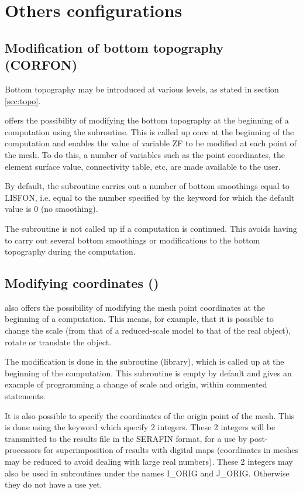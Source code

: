 \chapter{Others configurations}

\section{Modification of bottom topography (CORFON)}

Bottom topography may be introduced at various levels, as stated in section
\ref{sec:topo}.

 offers the possibility of modifying the bottom topography at the
beginning of a computation using the  subroutine. This is
called up once at the beginning of the computation and enables the value of
variable ZF to be modified at each point of the mesh. To do this, a number of
variables such as the point coordinates, the element surface value,
connectivity table, etc, are made available to the user.

By default, the  subroutine carries out a number of bottom
smoothings equal to LISFON, i.e. equal to the number specified by the keyword
 for which the default value is 0 (no
smoothing).

The  subroutine is not called up if a computation is continued.
This avoids having to carry out several bottom smoothings or modifications to
the bottom topography during the computation.


\section{Modifying coordinates ()}

 also offers the possibility of modifying the mesh point coordinates
at the beginning of a computation. This means, for example, that it is possible
to change the scale (from that of a reduced-scale model to that of the real
object), rotate or translate the object.

The modification is done in the  subroutine (\bief library), which
is called up at the beginning of the computation. This subroutine is empty by
default and gives an example of programming a change of scale and origin,
within commented statements.

It is also possible to specify the coordinates of the origin point of the mesh.
This is done using the keyword  which specify 2
integers. These 2 integers will be transmitted to the results file in the
SERAFIN format, for a use by post-processors for superimposition of results
with digital maps (coordinates in meshes may be reduced to avoid dealing with
large real numbers). These 2 integers may also be used in subroutines under the
names I\_ORIG and J\_ORIG. Otherwise they do not have a use yet.


